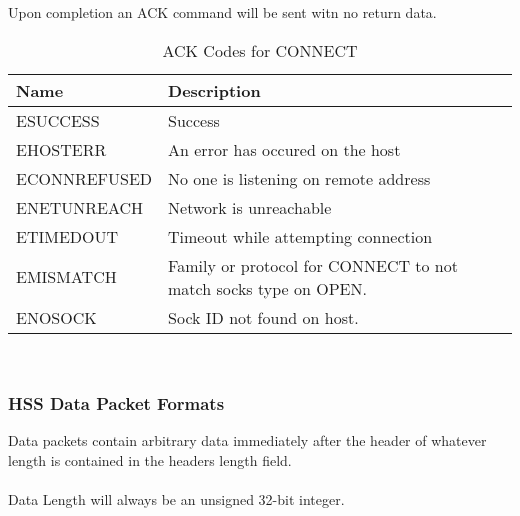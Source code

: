 \documentclass[10pt]{article}
\begin{document}
    Upon completion an ACK command will be sent witn no return data. 
	\\
	\begin{table}[H]
		\begin{center}
			\caption{ACK Codes for CONNECT}
			\label{tab:connErrTable}
			\begin{tabular}{l|l} 
				\rowcolor{lightgray}
				\textbf{Name} & \textbf{Description}\\
				\hline
				ESUCCESS & Success\\
				EHOSTERR & An error has occured on the host\\
				ECONNREFUSED & No one is listening on remote address\\
				ENETUNREACH & Network is unreachable\\
				ETIMEDOUT & Timeout while attempting connection\\
				EMISMATCH & Family or protocol for CONNECT to not match socks type on OPEN.\\
				ENOSOCK & Sock ID not found on host. \\
			\end{tabular}
		\end{center}
	\end{table} \mbox{}\\
	\subsubsection{HSS Data Packet Formats} \mbox{}
	Data packets contain arbitrary data immediately after the header of whatever length is contained in the headers length field. \\
	\\
	Data Length will always be an unsigned 32-bit integer. 
\end{document}
